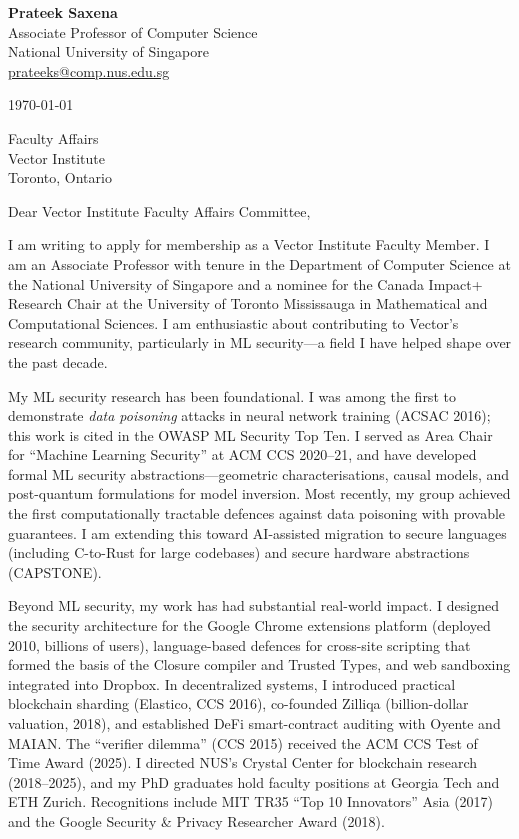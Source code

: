 \documentclass[11pt]{article}
\begin{document}
\begin{flushright}
\textbf{Prateek Saxena}\\
Associate Professor of Computer Science\\
National University of Singapore\\
\href{mailto:prateeks@comp.nus.edu.sg}{prateeks@comp.nus.edu.sg}
\end{flushright}

\vspace{0.5em}
\noindent
\today

\vspace{0.5em}
\noindent
Faculty Affairs\\
Vector Institute\\
Toronto, Ontario

\vspace{0.3em}
\noindent
Dear Vector Institute Faculty Affairs Committee,

\vspace{0.3em}
\noindent
I am writing to apply for membership as a Vector Institute Faculty Member. I am an Associate Professor with tenure in the Department of Computer Science at the National University of Singapore and a nominee for the Canada Impact+ Research Chair at the University of Toronto Mississauga in Mathematical and Computational Sciences. I am enthusiastic about contributing to Vector's research community, particularly in ML security---a field I have helped shape over the past decade.

\noindent
My ML security research has been foundational. I was among the first to demonstrate \emph{data poisoning} attacks in neural network training (ACSAC 2016); this work is cited in the OWASP ML Security Top Ten. I served as Area Chair for ``Machine Learning Security'' at ACM CCS 2020--21, and have developed formal ML security abstractions---geometric characterisations, causal models, and post-quantum formulations for model inversion. Most recently, my group achieved the first computationally tractable defences against data poisoning with provable guarantees. I am extending this toward AI-assisted migration to secure languages (including C-to-Rust for large codebases) and secure hardware abstractions (CAPSTONE).

\noindent
Beyond ML security, my work has had substantial real-world impact. I designed the security architecture for the Google Chrome extensions platform (deployed 2010, billions of users), language-based defences for cross-site scripting that formed the basis of the Closure compiler and Trusted Types, and web sandboxing integrated into Dropbox. In decentralized systems, I introduced practical blockchain sharding (Elastico, CCS 2016), co-founded Zilliqa (billion-dollar valuation, 2018), and established DeFi smart-contract auditing with Oyente and MAIAN. The ``verifier dilemma'' (CCS 2015) received the ACM CCS Test of Time Award (2025). I directed NUS's Crystal Center for blockchain research (2018--2025), and my PhD graduates hold faculty positions at Georgia Tech and ETH Zurich. Recognitions include MIT TR35 ``Top 10 Innovators'' Asia (2017) and the Google Security \& Privacy Researcher Award (2018).
\end{document}
